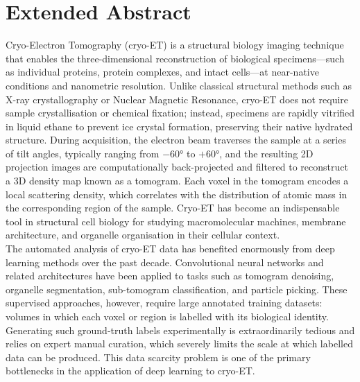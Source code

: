 

\chapter*{Extended Abstract}

Cryo-Electron Tomography (cryo-ET) is a structural biology imaging technique that enables the
three-dimensional reconstruction of biological specimens—such as individual proteins, protein
complexes, and intact cells—at near-native conditions and nanometric resolution. Unlike classical
structural methods such as X-ray crystallography or Nuclear Magnetic Resonance, cryo-ET does not
require sample crystallisation or chemical fixation; instead, specimens are rapidly vitrified in
liquid ethane to prevent ice crystal formation, preserving their native hydrated structure. During
acquisition, the electron beam traverses the sample at a series of tilt angles, typically ranging
from $-60°$ to $+60°$, and the resulting 2D projection images are computationally back-projected
and filtered to reconstruct a 3D density map known as a tomogram. Each voxel in the tomogram
encodes a local scattering density, which correlates with the distribution of atomic mass in the
corresponding region of the sample. Cryo-ET has become an indispensable tool in structural cell
biology for studying macromolecular machines, membrane architecture, and organelle organisation
in their cellular context.\\

The automated analysis of cryo-ET data has benefited enormously from deep learning methods over
the past decade. Convolutional neural networks and related architectures have been applied to tasks
such as tomogram denoising, organelle segmentation, sub-tomogram classification, and particle
picking. These supervised approaches, however, require large annotated training datasets: volumes
in which each voxel or region is labelled with its biological identity. Generating such ground-truth
labels experimentally is extraordinarily tedious and relies on expert manual curation, which
severely limits the scale at which labelled data can be produced. This data scarcity problem is
one of the primary bottlenecks in the application of deep learning to cryo-ET.\\

